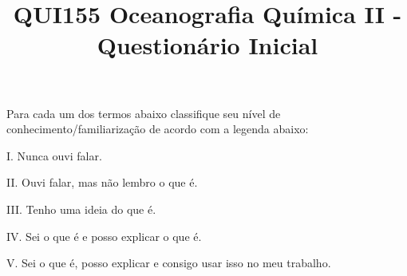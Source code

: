\documentclass[a4paper,10pt]{article}
\title{QUI155 Oceanografia Química II - Questionário Inicial}
\author{\vspace{-10ex}}
\date{\vspace{-10ex}}
\begin{document}
  \maketitle
  \onehalfspace

Para cada um dos termos abaixo classifique seu nível de conhecimento/familiarização de acordo com a legenda abaixo:

\begin{multicols}{2}

I. Nunca ouvi falar.

II. Ouvi falar, mas não lembro o que é.

III. Tenho uma ideia do que é.

IV. Sei o que é e posso explicar o que é.

V. Sei o que é, posso explicar e consigo usar isso no meu trabalho.

\end{multicols}
\end{document}
